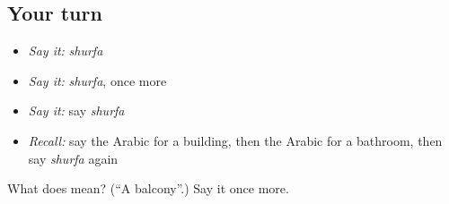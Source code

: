 \subsection*{Your turn}
\begin{itemize}
\raggedright
  \item \emph{Say it:} \emph{shurfa}
  \item \emph{Say it:} \emph{shurfa}, once more
  \item \emph{Say it:} say \emph{shurfa}
  \item \emph{Recall:} say the Arabic for a building, then the Arabic for a bathroom, then say \emph{shurfa} again
\end{itemize}

\begin{tcolorbox}[breakable,colback=teal!4,colframe=teal!35!black,title={Before you move on}]
What does  mean? (\textquotedblleft{}A balcony\textquotedblright{}.) Say it once more.
\end{tcolorbox}
